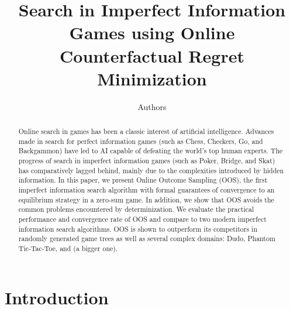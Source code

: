 \documentclass[letterpaper]{article}
\begin{document}
%
\title{Search in Imperfect Information Games using Online\\Counterfactual Regret Minimization}
\author{Authors}


\maketitle

\begin{abstract}
Online search in games has been a classic interest of artificial intelligence.
Advances made in search for perfect information games (such as Chess, Checkers, Go, and Backgammon) have led to AI capable of defeating the world's top human experts. 
The progress of search in imperfect information games (such as Poker, Bridge, and Skat) has comparatively lagged behind, mainly due to the complexities introduced by hidden information. 
In this paper, we present Online Outcome Sampling (OOS), the first imperfect information search algorithm with formal guarantees of convergence to an equilibrium strategy in a zero-sum game.   
In addition, we show that OOS avoids the common problems encountered by determinization.
We evaluate the practical performance and convergence rate of OOS and compare to two modern imperfect information search algorithms.
OOS is shown to outperform its competitors in randomly generated game trees as well as several complex domains: 
Dudo, Phantom Tic-Tac-Toe, and (a bigger one). 
\end{abstract}

\section{Introduction}

\end{document}
